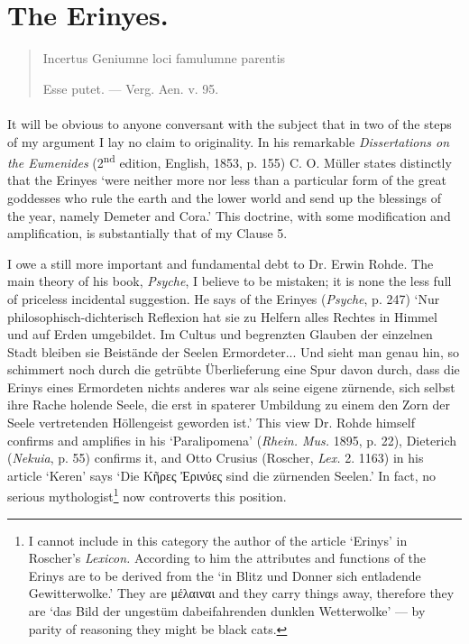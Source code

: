 \documentclass[a4paper, 11pt, oneside, polutonikogreek, english]{article}
\begin{document}
\section{The Erinyes.}
\begin{quotation}
\large
Incertus Geniumne loci famulumne parentis  

Esse putet. --- Verg. Aen. v. 95.
\end{quotation}
\paragraph{}
It will be obvious to anyone conversant with the subject that in two of the steps of my argument I lay no claim to originality. In his remarkable \emph{Dissertations on the Eumenides} (2\textsuperscript{nd} edition, English, 1853, p. 155) C. O. Müller states distinctly that the Erinyes `were neither more nor less than a particular form of the great goddesses who rule the earth and the lower world and send up the blessings of the year, namely Demeter and Cora.' This doctrine, with some modification and amplification, is substantially that of my Clause 5.

I owe a still more important and fundamental debt to Dr. Erwin Rohde. The main theory of his book, \emph{Psyche}, I believe to be mistaken; it is none the less full of priceless incidental suggestion. He says of the Erinyes (\emph{Psyche}, p. 247) `Nur philosophisch-dichterisch Reflexion hat sie zu Helfern alles Rechtes in Himmel und auf Erden umgebildet. Im Cultus und begrenzten Glauben der einzelnen Stadt bleiben sie Beistände der Seelen Ermordeter... Und sieht man genau hin, so schimmert noch durch die getrübte Überlieferung eine Spur davon durch, dass die Erinys eines Ermordeten nichts anderes war als seine eigene zürnende, sich selbst ihre Rache holende Seele, die erst in spaterer Umbildung zu einem den Zorn der Seele vertretenden Höllengeist geworden ist.' This view Dr. Rohde himself confirms and amplifies in his `Paralipomena' (\emph{Rhein. Mus.} 1895, p. 22), Dieterich (\emph{Nekuia}, p. 55) confirms it, and Otto Crusius (Roscher, \emph{Lex.} 2. 1163) in his article `Keren' says `Die Κῆρες Ἐρινύες sind die zürnenden Seelen.' In fact, no serious mythologist\footnote{I cannot include in this category the author of the article `Erinys' in Roscher's \emph{Lexicon.} According to him the attributes and functions of the Erinys are to be derived from the `in Blitz und Donner sich entladende Gewitterwolke.' They are μέλαιναι and they carry things away, therefore they are `das Bild der ungestüm dabeifahrenden dunklen Wetterwolke' --- by parity of reasoning they might be black cats.} now controverts this position.
\end{document}
